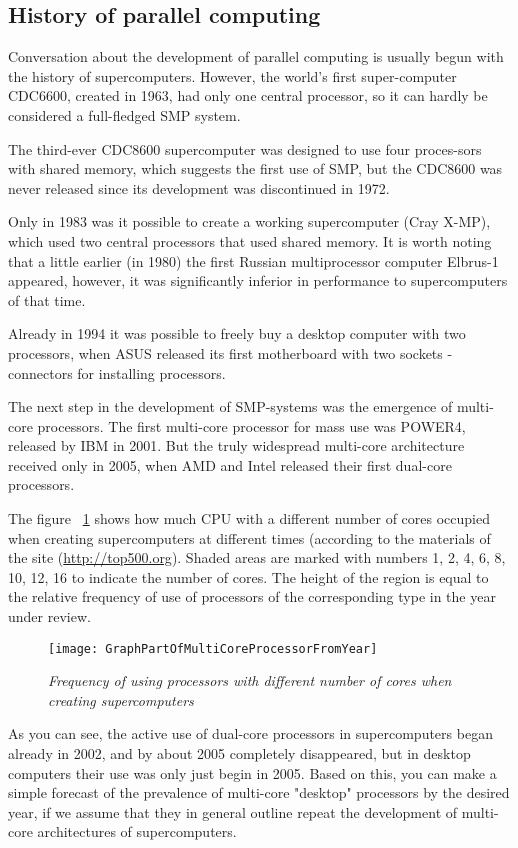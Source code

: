 { %
	\subsection{History of parallel computing}
	\par Conversation about the development of parallel computing is usually begun with the history of supercomputers. However, the world's first super-computer CDC6600, created in 1963, had only one central processor, so it can hardly be considered a full-fledged SMP system.
	\par The third-ever CDC8600 supercomputer was designed to use four proces-sors with shared memory, which suggests the first use of SMP, but the CDC8600 was never released since its development was discontinued in 1972.
	\par Only in 1983 was it possible to create a working supercomputer (Cray X-MP), which used two central processors that used shared memory. It is worth noting that a little earlier (in 1980) the first Russian multiprocessor computer Elbrus-1 appeared, however, it was significantly inferior in performance to supercomputers of that time.
	\par Already in 1994 it was possible to freely buy a desktop computer with two processors, when ASUS released its first motherboard with two sockets - connectors for installing processors.
	\par The next step in the development of SMP-systems was the emergence of multi-core processors. The first multi-core processor for mass use was POWER4, released by IBM in 2001. But the truly widespread multi-core architecture received only in 2005, when AMD and Intel released their first dual-core processors.
	\par The figure ~\ref{GraphPartOfMultiCoreProcessorFromYear:image} shows how much CPU with a different number of cores occupied when creating supercomputers at different times (according to the materials of the site (\url{http://top500.org}). Shaded areas are marked with numbers 1, 2, 4, 6, 8, 10, 12, 16 to indicate the number of cores. The height of the region is equal to the relative frequency of use of processors of the corresponding type in the year under review.
	\begin{figure}[H]
		\texttt{[image: GraphPartOfMultiCoreProcessorFromYear]}
		\caption{\textit{Frequency of using processors with different number of cores when creating supercomputers}}
		\label{GraphPartOfMultiCoreProcessorFromYear:image}
	\end{figure}
	\par As you can see, the active use of dual-core processors in supercomputers began already in 2002, and by about 2005 completely disappeared, but in desktop computers their use was only just begin in 2005. Based on this, you can make a simple forecast of the prevalence of multi-core "desktop"  processors by the desired year, if we assume that they in general outline repeat the development of multi-core architectures of supercomputers.
	\par
}
